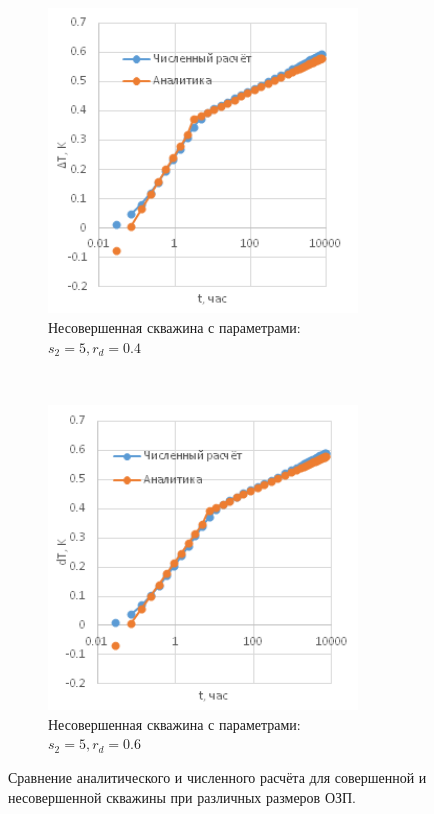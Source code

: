 \begin{figure}[H]
\begin{subfigure}[b]{0.5\textwidth}
		\label{pic:imperf1}
	\end{subfigure}
	\begin{subfigure}[b]{0.5\textwidth}
		\centering
		\includegraphics[width=0.9\textwidth]{pic/imperf2.png}
		\caption{Несовершенная скважина с параметрами: $s_2=5, r_d = 0.4$}
		\label{pic:imperf2}
	\end{subfigure}
~
	\begin{subfigure}[b]{0.5\textwidth}
		\centering
		\includegraphics[width=0.9\textwidth]{pic/imperf3.png}
		\caption{Несовершенная скважина с параметрами: $s_2=5, r_d = 0.6$}
		\label{pic:imperf3}
	\end{subfigure}
	\caption{Сравнение аналитического и численного расчёта для совершенной и несовершенной скважины при различных размеров ОЗП.}
	\label{pic:analytic_cmp}
\end{figure}
